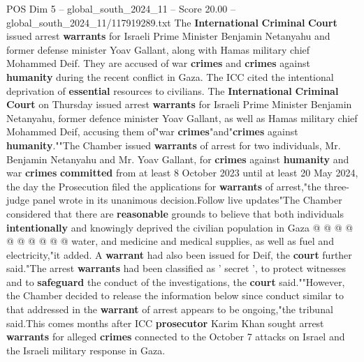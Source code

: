 \begin{textsample}{POS Dim 5 – global\_south\_2024\_11 – Score 20.00 – global\_south\_2024\_11/117919289.txt}  \label{ex:f5_pos_025}
The \textbf{International} \textbf{Criminal} \textbf{Court} issued arrest \textbf{warrants} for Israeli Prime Minister Benjamin Netanyahu and former defense minister Yoav Gallant, along with Hamas military chief Mohammed Deif.
They are accused of war \textbf{crimes} and \textbf{crimes} against \textbf{humanity} during the recent conflict in Gaza.
The ICC cited the intentional deprivation of \textbf{essential} resources to civilians.
The \textbf{International} \textbf{Criminal} \textbf{Court} on Thursday issued arrest \textbf{warrants} for Israeli Prime Minister Benjamin Netanyahu, former defence minister Yoav Gallant, as well as Hamas military chief Mohammed Deif, accusing them of"war \textbf{crimes}"and"\textbf{crimes} against \textbf{humanity}.""The Chamber issued \textbf{warrants} of arrest for two individuals, Mr.
Benjamin Netanyahu and Mr.
Yoav Gallant, for \textbf{crimes} against \textbf{humanity} and war \textbf{crimes} \textbf{committed} from at least 8 October 2023 until at least 20 May 2024, the day the Prosecution filed the applications for \textbf{warrants} of arrest,"the three-judge panel wrote in its unanimous decision.Follow live updates"The Chamber considered that there are \textbf{reasonable} grounds to believe that both individuals \textbf{intentionally} and knowingly deprived the civilian population in Gaza @ @ @ @ @ @ @ @ @ @ water, and medicine and medical supplies, as well as fuel and electricity,"it added.
A \textbf{warrant} had also been issued for Deif, the \textbf{court} further said."The arrest \textbf{warrants} had been classified as ' secret ', to protect witnesses and to \textbf{safeguard} the conduct of the investigations, the \textbf{court} said.""However, the Chamber decided to release the information below since conduct similar to that addressed in the \textbf{warrant} of arrest appears to be ongoing,"the tribunal said.This comes months after ICC \textbf{prosecutor} Karim Khan sought arrest \textbf{warrants} for alleged \textbf{crimes} connected to the October 7 attacks on Israel and the Israeli military response in Gaza.

\end{textsample}
